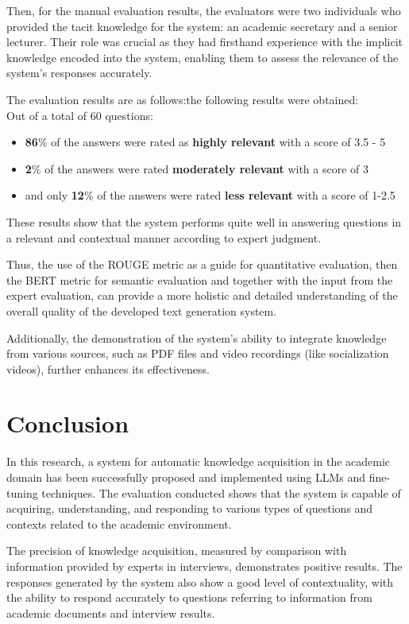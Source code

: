 \documentclass[runningheads]{llncs}
\begin{document}
Then, for the manual evaluation results, the evaluators were two individuals who provided the tacit knowledge for the system: an academic secretary and a senior lecturer. Their role was crucial as they had firsthand experience with the implicit knowledge encoded into the system, enabling them to assess the relevance of the system's responses accurately.

The evaluation results are as follows:the following results were obtained: \\
Out of a total of 60 questions:
\begin{itemize}
    \item \textbf{86}\% of the answers were rated as \textbf{highly relevant} with a score of 3.5 - 5
    \item \textbf{2}\% of the answers were rated \textbf{moderately relevant} with a score of 3
    \item and only \textbf{12}\% of the answers were rated \textbf{less relevant} with a score of 1-2.5
\end{itemize}

These results show that the system performs quite well in answering questions in a relevant and contextual manner according to expert judgment.

Thus, the use of the ROUGE metric as a guide for quantitative evaluation, then the BERT metric for semantic evaluation and together with the input from the expert evaluation, can provide a more holistic and detailed understanding of the overall quality of the developed text generation system.

Additionally, the demonstration of the system's ability to integrate knowledge from various sources, such as PDF files and video recordings (like socialization videos), further enhances its effectiveness.

\section{Conclusion}
In this research, a system for automatic knowledge acquisition in the academic domain has been successfully proposed and implemented using LLMs and fine-tuning techniques. The evaluation conducted shows that the system is capable of acquiring, understanding, and responding to various types of questions and contexts related to the academic environment.

The precision of knowledge acquisition, measured by comparison with information provided by experts in interviews, demonstrates positive results. The responses generated by the system also show a good level of contextuality, with the ability to respond accurately to questions referring to information from academic documents and interview results.
\end{document}
